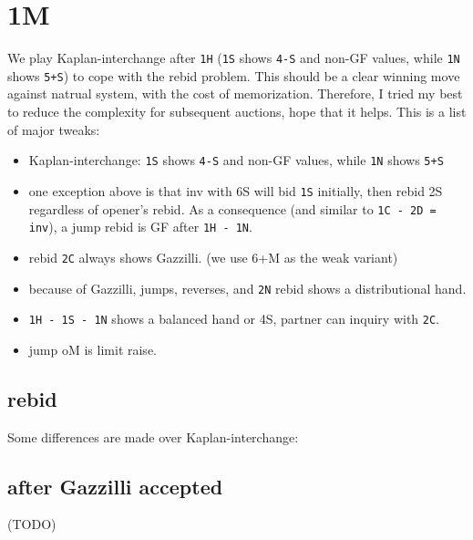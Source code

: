 \section{1M}

We play Kaplan-interchange after \texttt{1H} (\texttt{1S} shows \texttt{4-S} and non-GF values, while \texttt{1N} shows \texttt{5+S}) to cope with the rebid problem.
This should be a clear winning move against natrual system, with the cost of memorization.
Therefore, I tried my best to reduce the complexity for subsequent auctions, hope that it helps.
This is a list of major tweaks:
\begin{itemize}
    \setlength\itemsep{0pt}
    \item Kaplan-interchange: \texttt{1S} shows \texttt{4-S} and non-GF values, while \texttt{1N} shows \texttt{5+S}
    \item one exception above is that inv with 6S will bid \texttt{1S} initially, then rebid 2S regardless of opener's rebid. As a consequence (and similar to \texttt{1C - 2D = inv}), a jump rebid is GF after \texttt{1H - 1N}.
    \item rebid \texttt{2C} always shows Gazzilli. (we use 6+M as the weak variant)
    \item because of Gazzilli, jumps, reverses, and \texttt{2N} rebid shows a distributional hand.
    \item \texttt{1H - 1S - 1N} shows a balanced hand or 4S, partner can inquiry with \texttt{2C}.
    \item jump oM is limit raise.
\end{itemize}


\subsection{rebid}


Some differences are made over Kaplan-interchange:

\subsection{after Gazzilli accepted}

(TODO)

